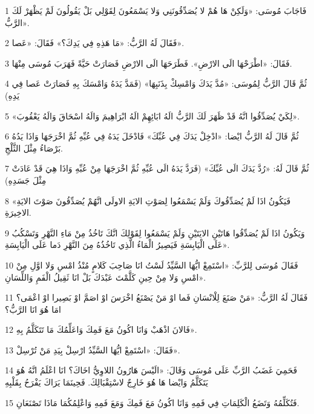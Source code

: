 \par 1 فَاجَابَ مُوسَى: «وَلَكِنْ هَا هُمْ لا يُصَدِّقُونَنِي وَلا يَسْمَعُونَ لِقَوْلِي بَلْ يَقُولُونَ لَمْ يَظْهَرْ لَكَ الرَّبُّ».
\par 2 فَقَالَ لَهُ الرَّبُّ: «مَا هَذِهِ فِي يَدِكَ؟» فَقَالَ: «عَصا».
\par 3 فَقَالَ: «اطْرَحْهَا الَى الارْضِ». فَطَرَحَهَا الَى الارْضِ فَصَارَتْ حَيَّةً فَهَرَبَ مُوسَى مِنْهَا.
\par 4 ثُمَّ قَالَ الرَّبُّ لِمُوسَى: «مُدَّ يَدَكَ وَامْسِكْ بِذَنَبِهَا» (فَمَدَّ يَدَهُ وَامْسَكَ بِهِ فَصَارَتْ عَصا فِي يَدِهِ)
\par 5 «لِكَيْ يُصَدِّقُوا انَّهُ قَدْ ظَهَرَ لَكَ الرَّبُّ الَهُ ابَائِهِمْ الَهُ ابْرَاهِيمَ وَالَهُ اسْحَاقَ وَالَهُ يَعْقُوبَ».
\par 6 ثُمَّ قَالَ لَهُ الرَّبُّ ايْضا: «ادْخِلْ يَدَكَ فِي عُبِّكَ» فَادْخَلَ يَدَهُ فِي عُبِّهِ ثُمَّ اخْرَجَهَا وَاذَا يَدُهُ بَرْصَاءُ مِثْلَ الثَّلْجِ.
\par 7 ثُمَّ قَالَ لَهُ: «رُدَّ يَدَكَ الَى عُبِّكَ» (فَرَدَّ يَدَهُ الَى عُبِّهِ ثُمَّ اخْرَجَهَا مِنْ عُبِّهِ وَاذَا هِيَ قَدْ عَادَتْ مِثْلَ جَسَدِهِ)
\par 8 «فَيَكُونُ اذَا لَمْ يُصَدِّقُوكَ وَلَمْ يَسْمَعُوا لِصَوْتِ الايَةِ الاولَى انَّهُمْ يُصَدِّقُونَ صَوْتَ الايَةِ الاخِيرَةِ.
\par 9 وَيَكُونُ اذَا لَمْ يُصَدِّقُوا هَاتَيْنِ الايَتَيْنِ وَلَمْ يَسْمَعُوا لِقَوْلِكَ انَّكَ تَاخُذُ مِنْ مَاءِ النَّهْرِ وَتَسْكُبُ عَلَى الْيَابِسَةِ فَيَصِيرُ الْمَاءُ الَّذِي تَاخُذُهُ مِنَ النَّهْرِ دَما عَلَى الْيَابِسَةِ».
\par 10 فَقَالَ مُوسَى لِلرَّبِّ: «اسْتَمِعْ ايُّهَا السَّيِّدُ لَسْتُ انَا صَاحِبَ كَلامٍ مُنْذُ امْسِ وَلا اوَّلِ مِنْ امْسِ وَلا مِنْ حِينِ كَلَّمْتَ عَبْدَكَ بَلْ انَا ثَقِيلُ الْفَمِ وَاللِّسَانِ».
\par 11 فَقَالَ لَهُ الرَّبُّ: «مَنْ صَنَعَ لِلْانْسَانِ فَما اوْ مَنْ يَصْنَعُ اخْرَسَ اوْ اصَمَّ اوْ بَصِيرا اوْ اعْمَى؟ امَا هُوَ انَا الرَّبُّ؟
\par 12 فَالانَ اذْهَبْ وَانَا اكُونُ مَعَ فَمِكَ وَاعَلِّمُكَ مَا تَتَكَلَّمُ بِهِ».
\par 13 فَقَالَ: «اسْتَمِعْ ايُّهَا السَّيِّدُ ارْسِلْ بِيَدِ مَنْ تُرْسِلْ».
\par 14 فَحَمِيَ غَضَبُ الرَّبِّ عَلَى مُوسَى وَقَالَ: «الَيْسَ هَارُونُ اللاوِيُّ اخَاكَ؟ انَا اعْلَمُ انَّهُ هُوَ يَتَكَلَّمُ وَايْضا هَا هُوَ خَارِجٌ لاسْتِقْبَالِكَ. فَحِينَمَا يَرَاكَ يَفْرَحُ بِقَلْبِهِ
\par 15 فَتُكَلِّمُهُ وَتَضَعُ الْكَلِمَاتِ فِي فَمِهِ وَانَا اكُونُ مَعَ فَمِكَ وَمَعَ فَمِهِ وَاعْلِمُكُمَا مَاذَا تَصْنَعَانِ.
